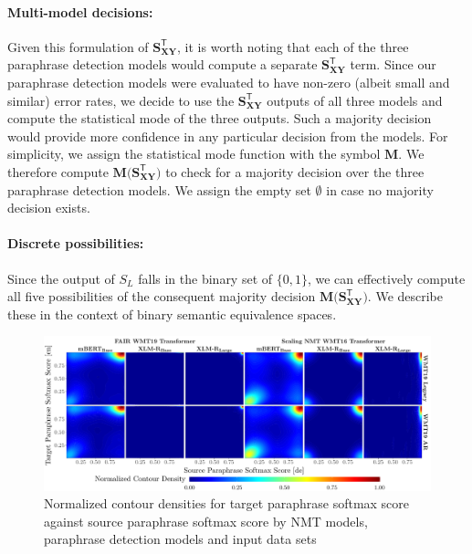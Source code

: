 \documentclass[11pt,a4paper]{article}
\begin{document}
\paragraph{Multi-model decisions:} Given this formulation of $\mathbf{S_{XY}^{\mathsf{T}}}$, it is worth noting that each of the three paraphrase detection models would compute a separate $\mathbf{S_{XY}^{\mathsf{T}}}$ term. Since our paraphrase detection models were evaluated to have non-zero (albeit small and similar) error rates, we decide to use the $\mathbf{S_{XY}^{\mathsf{T}}}$ outputs of all three models and compute the statistical mode of the three outputs. Such a majority decision would provide more confidence in any particular decision from the models. For simplicity, we assign the statistical mode function with the symbol $\mathbf{M}$. We therefore compute $\mathbf{M(S_{XY}^{\mathsf{T}}})$ to check for a majority decision over the three paraphrase detection models. We assign the empty set $\emptyset$ in case no majority decision exists.

\paragraph{Discrete possibilities:} Since the output of $S_L$ falls in the binary set of $\{0,1\}$, we can effectively compute all five possibilities of the consequent majority decision $\mathbf{M(S_{XY}^{\mathsf{T}}})$. We describe these in the context of binary semantic equivalence spaces.

\begin{figure}
  \centering 
  \includegraphics[trim={0cm 0cm 0cm 0cm},clip,width=\textwidth]{paraphrase_detection_softmax_all.pdf}
  \caption{Normalized contour densities for target paraphrase softmax score against source paraphrase softmax score by NMT models, paraphrase detection models and input data sets}
  \label{paraphrase_detection_softmax_all}
\end{figure}
\end{document}
